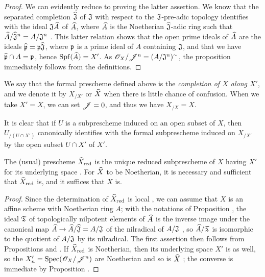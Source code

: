 \begin{proof}
\label{proof-1.10.8.5}
We can evidently reduce to proving the latter assertion.
We know  that the separated completion $\widehat{\mathfrak{J}}$ of $\mathfrak{J}$ with respect to the $\mathfrak{J}$-pre-adic topology identifies with the ideal $\mathfrak{J}\widehat{A}$ of $\widehat{A}$, where $\widehat{A}$ is the Noetherian $\widehat{\mathfrak{J}}$-adic ring such that $\widehat{A}/\widehat{\mathfrak{J}}^n=A/\mathfrak{J}^n$ .
This latter relation shows that the open prime ideals of $\widehat{A}$ are the ideals $\widehat{\mathfrak{p}}=\mathfrak{p}\widehat{\mathfrak{J}}$, where $\mathfrak{p}$ is a prime ideal of $A$ containing $\mathfrak{J}$, and that we have $\widehat{\mathfrak{p}}\cap A=\mathfrak{p}$, hence ${\mathop{\mathrm{Spf}}\nolimits}(\widehat{A})=X'$.
As $\mathscr{O}_X/\mathscr{J}^n=(A/\mathfrak{J}^n)^\sim$, the proposition immediately follows from the definitions.
\end{proof}

We say that the formal prescheme defined above is the \emph{completion of $X$ along $X'$}, and we denote it by $X_{/X'}$ or $\widehat{X}$ when there is little chance of confusion.
When we take $X'=X$, we can set $\mathscr{J}=0$, and thus we have $X_{/X}=X$.

It is clear that if $U$ is a subprescheme induced on an open subset of $X$, then $U_{/(U\cap X')}$ canonically identifies with the formal subprescheme induced on $X_{/X'}$ by the open subset $U\cap X'$ of $X'$.

\begin{cor}[10.8.6]
\label{1.10.8.6}
The (usual) prescheme $\widehat{X}_{\mathrm{red}}$ is the unique reduced subprescheme of $X$ having $X'$ for its underlying space .
For $\widehat{X}$ to be Noetherian, it is necessary and sufficient that $\widehat{X}_{\mathrm{red}}$ is, and it suffices that $X$ is.
\end{cor}

\begin{proof}
\label{proof-1.10.8.6}
Since the determination of $\widehat{X}_{\mathrm{red}}$ is local , we can assume that $X$ is an affine scheme with Noetherian ring $A$; with the notations of Proposition , the ideal $\mathfrak{T}$ of topologically nilpotent elements of $\widehat{A}$ is the inverse image under the canonical map $\wh{A}\to\wh{A}/\wh{\fk{J}}=A/\fk{J}$ of the nilradical of $A/\mathfrak{J}$ , so $\widehat{A}/\mathfrak{T}$ is isomorphic to the quotient of $A/\mathfrak{J}$ by its nilradical.
The first assertion then follows from Propositions  and .
If $\widehat{X}_{\mathrm{red}}$ is Noetherian, then its underlying space $X'$ is as well, so the $X_n'={\mathop{\mathrm{Spec}}\nolimits}(\mathscr{O}_X/\mathscr{J}^n)$ are Noetherian  and so is $\widehat{X}$ ; the converse is immediate by Proposition .
\end{proof}

